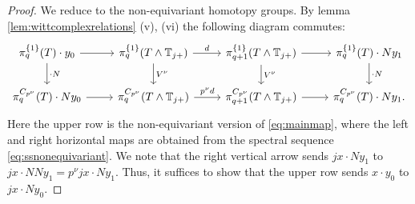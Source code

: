 \begin{proof}
We reduce to the non-equivariant homotopy groups. By 
lemma \ref{lem:wittcomplexrelations} (v), (vi) the following diagram commutes:
\[
\begin{tikzcd}
\pi_q^{\{1\}}(T)\cdot y_0
\arrow{r}\arrow{d}{\cdot N}
&\pi_q^{\{1\}}(T\wedge \TT_{j+})
\arrow{d}{V^\nu}\arrow{r}{d}
&\pi_{q+1}^{\{1\}}(T\wedge \TT_{j+})
\arrow{d}{V^\nu}\arrow{r}
&\pi_q^{\{1\}}(T)\cdot Ny_1
\arrow{d}{\cdot N}\\
\pi_q^{C_{p^\nu}}(T)\cdot Ny_0
\arrow{r}
&\pi_q^{C_{p^\nu}}(T\wedge \TT_{j+})
\arrow{r}{p^\nu d}
&\pi_{q+1}^{C_{p^\nu}}(T\wedge \TT_{j+})
\arrow{r}
&\pi_q^{C_{p^\nu}}(T)\cdot Ny_1.
\end{tikzcd}
\]
Here the upper row is the non-equivariant version of \eqref{eq:mainmap},
where the left and right horizontal maps are obtained from the spectral sequence \eqref{eq:ssnonequivariant}.
We note that the right vertical arrow sends $jx\cdot Ny_1$
to $jx\cdot NNy_1 = p^\nu jx \cdot Ny_1$. Thus, it suffices to
show that the upper row sends $x\cdot y_0$ to $jx \cdot Ny_0$.


\end{proof}
